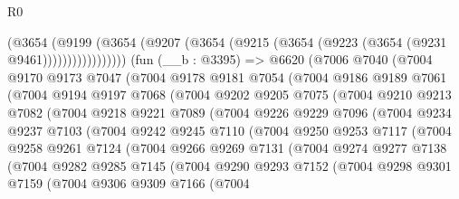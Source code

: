 \begin{lexlean}{R0}
\begin{coremodule}
                  (@3654
                    (@9199
                      (@3654 (@9207 (@3654 (@9215 (@3654 (@9223 (@3654 (@9231 @9461)))))))))))))))))
    (fun (__b : @3395) =>
    @6620
      (@7006
        @7040
        (@7004
          @9170
          @9173
          @7047
          (@7004
            @9178
            @9181
            @7054
            (@7004
              @9186
              @9189
              @7061
              (@7004
                @9194
                @9197
                @7068
                (@7004
                  @9202
                  @9205
                  @7075
                  (@7004
                    @9210
                    @9213
                    @7082
                    (@7004
                      @9218
                      @9221
                      @7089
                      (@7004
                        @9226
                        @9229
                        @7096
                        (@7004
                          @9234
                          @9237
                          @7103
                          (@7004
                            @9242
                            @9245
                            @7110
                            (@7004
                              @9250
                              @9253
                              @7117
                              (@7004
                                @9258
                                @9261
                                @7124
                                (@7004
                                  @9266
                                  @9269
                                  @7131
                                  (@7004
                                    @9274
                                    @9277
                                    @7138
                                    (@7004
                                      @9282
                                      @9285
                                      @7145
                                      (@7004
                                        @9290
                                        @9293
                                        @7152
                                        (@7004
                                          @9298
                                          @9301
                                          @7159
                                          (@7004
                                            @9306
                                            @9309
                                            @7166
                                            (@7004

\end{coremodule}
\end{lexlean}
